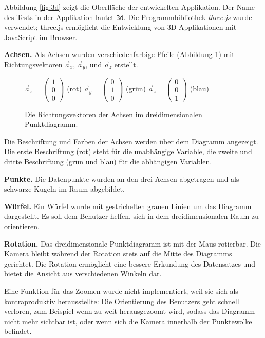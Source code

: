 Abbildung \ref{fig:3d} zeigt die Oberfläche der entwickelten Applikation. Der Name des Tests in der Applikation lautet \texttt{3d}. Die Programmbibliothek \textit{three.js} \cite{threejs} wurde verwendet; three.js ermöglicht die Entwicklung von 3D-Applikationen mit JavaScript im Browser.

\textbf{Achsen.} Als Achsen wurden verschiedenfarbige Pfeile (Abbildung \ref{fig:vectors}) mit Richtungsvektoren $\vec{a}_x$, $\vec{a}_y$, und $\vec{a}_z$ erstellt.

\begin{figure}[H]
	\centering
	$\vec{a}_x=\begin{pmatrix} 1 \\ 0 \\ 0 \end{pmatrix}$ (rot)\qquad
	$\vec{a}_y=\begin{pmatrix} 0 \\ 1 \\ 0 \end{pmatrix}$ (grün)\qquad
	$\vec{a}_z=\begin{pmatrix} 0 \\ 0 \\ 1 \end{pmatrix}$ (blau)\qquad
	\caption{Die Richtungsvektoren der Achsen im dreidimensionalen Punktdiagramm.}
	\label{fig:vectors}
\end{figure}

Die Beschriftung und Farben der Achsen werden über dem Diagramm angezeigt. Die erste Beschriftung (rot) steht für die unabhängige Variable, die zweite und dritte Beschriftung (grün und blau) für die abhängigen Variablen.

\textbf{Punkte.} Die Datenpunkte wurden an den drei Achsen abgetragen und als schwarze Kugeln im Raum abgebildet.

\textbf{Würfel.} Ein Würfel wurde mit gestrichelten grauen Linien um das Diagramm dargestellt. Es soll dem Benutzer helfen, sich in dem dreidimensionalen Raum zu orientieren.

\textbf{Rotation.} Das dreidimensionale Punktdiagramm ist mit der Maus rotierbar. Die Kamera bleibt während der Rotation stets auf die Mitte des Diagramms gerichtet. Die Rotation ermöglicht eine bessere Erkundung des Datensatzes und bietet die Ansicht aus verschiedenen Winkeln dar.

Eine Funktion für das Zoomen wurde nicht implementiert, weil sie sich als kontraproduktiv herausstellte: Die Orientierung des Benutzers geht schnell verloren, zum Beispiel wenn zu weit herausgezoomt wird, sodass das Diagramm nicht mehr sichtbar ist, oder wenn sich die Kamera innerhalb der Punktewolke befindet.

